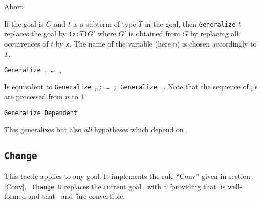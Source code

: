 \begin{coq_eval}
Abort.
\end{coq_eval}

If the goal is $G$ and $t$ is a subterm of type $T$ in the goal, then
{\tt Generalize} \textit{t} replaces the goal by {\tt (x:$T$)$G'$}
where $G'$ is obtained from $G$ by replacing all occurrences of $t$ by
{\tt x}. The name of the variable (here {\tt n}) is chosen accordingly
to $T$.

\begin{Variants}
\item {\tt Generalize \term$_1$ \dots\ \term$_n$} 
  
  Is equivalent to {\tt Generalize \term$_n$; \dots\ ; Generalize
    \term$_1$}. Note that the sequence of \term$_i$'s are processed
  from $n$ to $1$.
  
\item {\tt Generalize Dependent \term} 
  
  This generalizes {\term} but also {\em all} hypotheses which depend
  on {\term}.

\end{Variants}

\subsection{\tt Change \term}
\label{Change}

This tactic applies to any goal. It implements the rule
``Conv'' given in section \ref{Conv}.  {\tt
  Change U} replaces the current goal \T\ with a \U\ providing that
\U\ is well-formed and that \T\ and \U\ are convertible.

\begin{ErrMsgs}
\item {}
\end{ErrMsgs}

